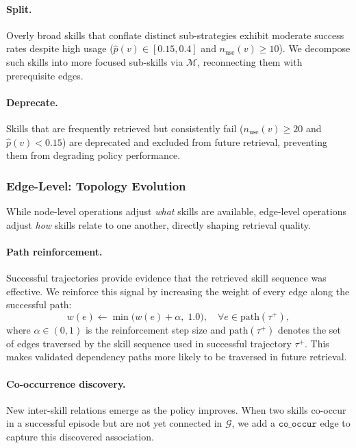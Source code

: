 \paragraph{Split.} Overly broad skills that conflate distinct sub-strategies exhibit moderate success rates despite high usage ($\hat{p}(v) \in [0.15, 0.4]$ and $n_{\text{use}}(v) \geq 10$). We decompose such skills into more focused sub-skills via $\mathcal{M}$, reconnecting them with prerequisite edges.

\paragraph{Deprecate.} Skills that are frequently retrieved but consistently fail ($n_{\text{use}}(v) \geq 20$ and $\hat{p}(v) < 0.15$) are deprecated and excluded from future retrieval, preventing them from degrading policy performance.

\subsubsection{Edge-Level: Topology Evolution}
\label{sec:edge_evolution}

While node-level operations adjust \emph{what} skills are available, edge-level operations adjust \emph{how} skills relate to one another, directly shaping retrieval quality.

\paragraph{Path reinforcement.} Successful trajectories provide evidence that the retrieved skill sequence was effective. We reinforce this signal by increasing the weight of every edge along the successful path:
\begin{equation}
    w(e) \leftarrow \min\bigl(w(e) + \alpha,\; 1.0\bigr), \quad \forall e \in \text{path}(\tau^+),
    \label{eq:path_reinforce}
\end{equation}
where $\alpha \in (0, 1)$ is the reinforcement step size and $\text{path}(\tau^+)$ denotes the set of edges traversed by the skill sequence used in successful trajectory $\tau^+$. This makes validated dependency paths more likely to be traversed in future retrieval.

\paragraph{Co-occurrence discovery.} New inter-skill relations emerge as the policy improves. When two skills co-occur in a successful episode but are not yet connected in $\mathcal{G}$, we add a $\texttt{co\_occur}$ edge to capture this discovered association.

